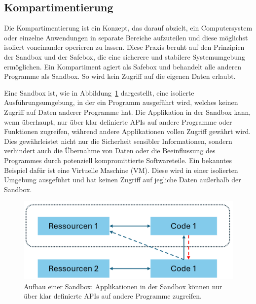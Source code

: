 \subsection{Kompartimentierung}

Die Kompartimentierung ist ein Konzept, das darauf abzielt, ein Computersystem oder einzelne Anwendungen in separate Bereiche aufzuteilen und diese möglichst isoliert voneinander operieren zu lassen. Diese Praxis beruht auf den Prinzipien der Sandbox und der Safebox, die eine sicherere und stabilere Systemumgebung ermöglichen. Ein Kompartiment agiert als Safebox und behandelt alle anderen Programme als Sandbox. So wird kein Zugriff auf die eigenen Daten erlaubt.

Eine Sandbox ist, wie in Abbildung~\ref{fig:Sandbox} dargestellt, eine isolierte Ausführungsumgebung, in der ein Programm ausgeführt wird, welches keinen Zugriff auf Daten anderer Programme hat. Die Applikation in der Sandbox kann, wenn überhaupt, nur über klar definierte APIs auf andere Programme oder Funktionen zugreifen, während andere Applikationen vollen Zugriff gewährt wird.
Dies gewährleistet nicht nur die Sicherheit sensibler Informationen, sondern verhindert auch die Übernahme von Daten oder die Beeinflussung des Programmes durch potenziell kompromittierte Softwareteile. 
Ein bekanntes Beispiel dafür ist eine Virtuelle Maschine (VM). Diese wird in einer isolierten Umgebung ausgeführt und hat keinen Zugriff auf jegliche Daten außerhalb der Sandbox.

\begin{figure}[h]
    \centering
    \includegraphics[width=0.7\linewidth]{Grafiken/Sandbox.png}
    \caption{Aufbau einer Sandbox: Applikationen in der Sandbox können nur über klar definierte APIs auf andere Programme zugreifen.}
    \label{fig:Sandbox}
\end{figure}

